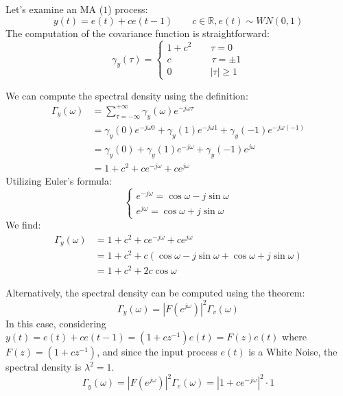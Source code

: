 \begin{example}
    Let's examine an MA ($1$) process:
    \[y(t)=e(t)+ce(t-1)\qquad c\in\mathbb{R},e(t)\sim WN(0,1)\]
    The computation of the covariance function is straightforward:
    \[\gamma_y(\tau)=\begin{cases}
        1+c^2 \qquad \tau=0 \\
        c \qquad\qquad\: \tau=\pm 1 \\
        0 \qquad\qquad \left\lvert \tau\right\rvert \geq 1
    \end{cases}\]

    We can compute the spectral density using the definition:
    \begin{align*}
        \Gamma_y(\omega)    &=\sum_{\tau=-\infty}^{+\infty}\gamma_y(\omega)e^{-j\omega\tau} \\
                            &=\gamma_y(0)e^{-j\omega 0} + \gamma_y(1)e^{-j\omega 1} +\gamma_y(-1)e^{-j\omega(-1)} \\
                            &=\gamma_y(0) + \gamma_y(1)e^{-j\omega} +\gamma_y(-1)e^{j\omega} \\
                            &=1+c^2 + ce^{-j\omega} +ce^{j\omega}                  
    \end{align*}
    Utilizing Euler's formula:
    \[\begin{cases}
        e^{-j\omega}= \cos\omega-j\sin\omega \\
        e^{j\omega}= \cos\omega+j\sin\omega
    \end{cases}\]
    We find:
    \begin{align*}
        \Gamma_y(\omega)    &=1+c^2 + ce^{-j\omega} +ce^{j\omega} \\        
                            &=1+c^2 + c\left(\cos\omega-j\sin\omega+\cos\omega+j\sin\omega\right) \\    
                            &=1+c^2 + 2c\cos\omega                               
    \end{align*}

    Alternatively, the spectral density can be computed using the theorem:
    \[\Gamma_y(\omega)=\left\lvert F(e^{j\omega})\right\rvert^2 \Gamma_v(\omega)\]
    In this case, considering $y(t)=e(t)+ce(t-1)=\left(1+cz^{-1}\right)e(t)=F(z)e(t)$ where $F(z)=\left(1+cz^{-1}\right)$, and since the input process $e(t)$ is a White Noise, the spectral density is $\lambda^2=1$.
    \[\Gamma_y(\omega)=\left\lvert F(e^{j\omega})\right\rvert^2 \Gamma_e(\omega)=\left\lvert 1+ce^{-j\omega}\right\rvert^2 \cdot 1\]
    

\end{example}
